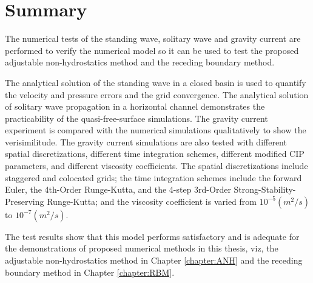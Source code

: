 \normalsize
\section{Summary}
The numerical tests of the standing wave, solitary wave and gravity current are performed to verify the numerical model so it can be used to test the proposed adjustable non-hydrostatics method and the receding boundary method.

The analytical solution of the standing wave in a closed basin \cite{LeBlond1978} \cite{Jankowski1999} is used to quantify the velocity and pressure errors and the grid convergence. The analytical solution of solitary wave propagation in a horizontal channel \cite{Laitone1960} \cite{Ramaswamy1990} \cite{Jankowski1999} demonstrates the practicability of the quasi-free-surface simulations. The gravity current experiment \cite{Maxworthy02} is compared with the numerical simulations qualitatively to show the verisimilitude. The gravity current simulations are also tested with different spatial discretizations, different time integration schemes, different modified CIP parameters, and different viscosity coefficients. The spatial discretizations include staggered and colocated grids; the time integration schemes include the forward Euler, the 4th-Order Runge-Kutta, and the 4-step 3rd-Order Strong-Stability-Preserving Runge-Kutta; and the viscosity coefficient is varied from $10^{-5} (m^2/s)$ to $10^{-7} (m^2/s)$.

The test results show that this model performs satisfactory and is adequate for the demonstrations of proposed numerical methods in this thesis, viz, the adjustable non-hydrostatics method in Chapter \ref{chapter:ANH} and the receding boundary method in Chapter \ref{chapter:RBM}.




\begin{comment}
The standing wave test and solitary wave test resulted in fair approximations to the analytical solutions. The grid convergence of standing wave test is achieved and the error is shown to reduced as $O(\Delta x ^ {1.2})$. The  gravity current simulations are shown to agree with the experimental fitting curves of $Fr(R)$.


 which is satisfactory but not as good as that of the second order spatial discretization. This reduction of the order of accuracy might be due to the complication associated with the free surface modeling. Because the objective of this model development is to provide a simple test ground for the feasibility of the two proposed methods, the improvement of the model accuracy will be left as future research work.
\end{comment} 